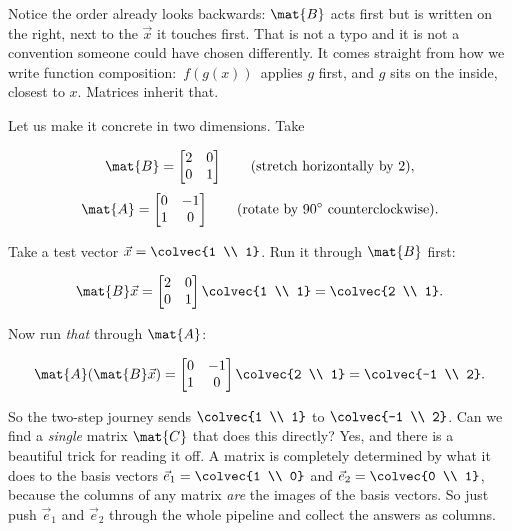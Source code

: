 Notice the order already looks backwards: $\mat{B}$ acts first but is written on the
right, next to the $\vec{x}$ it touches first. That is not a typo and it is not a
convention someone could have chosen differently. It comes straight from how we write
function composition: $\,f(g(x))\,$ applies $g$ first, and $g$ sits on the inside,
closest to $x$. Matrices inherit that.

Let us make it concrete in two dimensions. Take

\[
\mat{B} = \begin{bmatrix} 2 & 0 \\ 0 & 1 \end{bmatrix}
\qquad\text{(stretch horizontally by }2\text{)},
\]
\[
\mat{A} = \begin{bmatrix} 0 & -1 \\ 1 & 0 \end{bmatrix}
\qquad\text{(rotate by }90^\circ\text{ counterclockwise)}.
\]

Take a test vector $\vec{x} = \colvec{1 \\ 1}$. Run it through $\mat{B}$ first:

\[
\mat{B}\vec{x} = \begin{bmatrix} 2 & 0 \\ 0 & 1 \end{bmatrix}\colvec{1 \\ 1}
= \colvec{2 \\ 1}.
\]

Now run \emph{that} through $\mat{A}$:

\[
\mat{A}(\mat{B}\vec{x}) = \begin{bmatrix} 0 & -1 \\ 1 & 0 \end{bmatrix}\colvec{2 \\ 1}
= \colvec{-1 \\ 2}.
\]

So the two-step journey sends $\colvec{1 \\ 1}$ to $\colvec{-1 \\ 2}$. Can we find a
\emph{single} matrix $\mat{C}$ that does this directly? Yes, and there is a beautiful
trick for reading it off. A matrix is completely determined by what it does to the
basis vectors $\vec{e}_1 = \colvec{1 \\ 0}$ and $\vec{e}_2 = \colvec{0 \\ 1}$, because
the columns of any matrix \emph{are} the images of the basis vectors. So just push
$\vec{e}_1$ and $\vec{e}_2$ through the whole pipeline and collect the answers as
columns.

